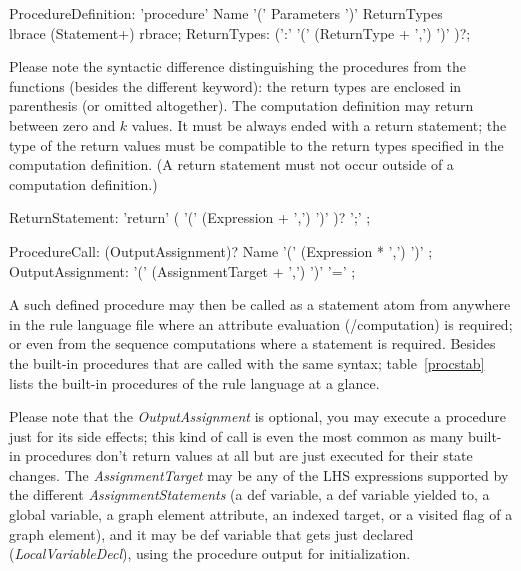 \begin{rail} 
  ProcedureDefinition: 
	'procedure' Name '(' Parameters ')' ReturnTypes \\
	lbrace (Statement+) rbrace;
  ReturnTypes: (':' '(' (ReturnType + ',') ')' )?;
\end{rail}

Please note the syntactic difference distinguishing the procedures from the functions (besides the different keyword): the return types are enclosed in parenthesis (or omitted altogether).
The computation definition may return between zero and $k$ values.
It must be always ended with a return statement; the type of the return values must be compatible to the return types specified in the computation definition.
(A return statement must not occur outside of a computation definition.)

\begin{rail}
  ReturnStatement: 'return' ( '(' (Expression + ',') ')' )? ';' ;
\end{rail}

\begin{rail}
  ProcedureCall: (OutputAssignment)? Name '(' (Expression * ',') ')' ;
  OutputAssignment: '(' (AssignmentTarget + ',') ')' '=' ;
\end{rail}

A such defined procedure may then be called as a statement atom from anywhere in the rule language file where an attribute evaluation (/computation) is required; or even from the sequence computations where a statement is required.
Besides the built-in procedures that are called with the same syntax;
table~\ref{procstab} lists the built-in procedures of the rule language at a glance.

Please note that the \emph{OutputAssignment} is optional, you may execute a procedure just for its side effects; this kind of call is even the most common as many built-in procedures don't return values at all but are just executed for their state changes.
The \emph{AssignmentTarget} may be any of the LHS expressions supported by the different \emph{AssignmentStatements} (a def variable, a def variable yielded to, a global variable, a graph element attribute, an indexed target, or a visited flag of a graph element), and it may be def variable that gets just declared (\emph{LocalVariableDecl}), using the procedure output for initialization.

